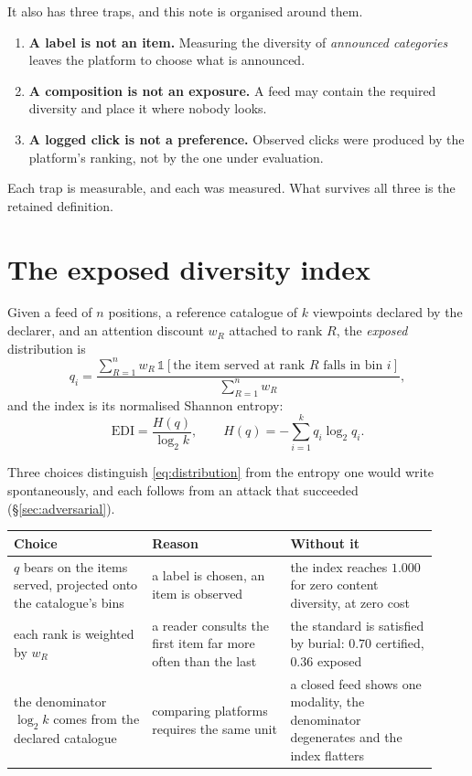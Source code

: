 \documentclass[11pt,a4paper]{article}
\begin{document}
It also has three traps, and this note is organised around them.

\begin{enumerate}
\item \textbf{A label is not an item.} Measuring the diversity of \emph{announced categories}
      leaves the platform to choose what is announced.
\item \textbf{A composition is not an exposure.} A feed may contain the required diversity and
      place it where nobody looks.
\item \textbf{A logged click is not a preference.} Observed clicks were produced by the
      platform's ranking, not by the one under evaluation.
\end{enumerate}

Each trap is measurable, and each was measured. What survives all three is the retained
definition.

\section{The exposed diversity index}
\label{sec:index}

Given a feed of $n$ positions, a reference catalogue of $k$ viewpoints declared by the
declarer, and an attention discount $w_R$ attached to rank $R$, the \emph{exposed}
distribution is
\begin{equation}
q_i = \frac{\sum_{R=1}^{n} w_R \, \mathbb{1}\!\left[\text{the item served at rank } R
      \text{ falls in bin } i\right]}{\sum_{R=1}^{n} w_R},
\label{eq:distribution}
\end{equation}
and the index is its normalised Shannon entropy:
\begin{equation}
\mathrm{EDI} = \frac{H(q)}{\log_2 k}, \qquad H(q) = -\sum_{i=1}^{k} q_i \log_2 q_i .
\label{eq:edi}
\end{equation}

Three choices distinguish \eqref{eq:distribution} from the entropy one would write
spontaneously, and each follows from an attack that succeeded (\S\ref{sec:adversarial}).

\begin{center}
\begin{tabular}{@{}p{0.30\linewidth}p{0.30\linewidth}p{0.32\linewidth}@{}}
\toprule
\textbf{Choice} & \textbf{Reason} & \textbf{Without it} \\
\midrule
$q$ bears on the items served, projected onto the catalogue's bins & a label is chosen, an item
is observed & the index reaches $1.000$ for zero content diversity, at zero cost \\[2mm]
each rank is weighted by $w_R$ & a reader consults the first item far more often than the last
& the standard is satisfied by burial: $0.70$ certified, $0.36$ exposed \\[2mm]
the denominator $\log_2 k$ comes from the declared catalogue & comparing platforms requires the
same unit & a closed feed shows one modality, the denominator degenerates and the index
flatters \\
\bottomrule
\end{tabular}
\end{center}
\end{document}
